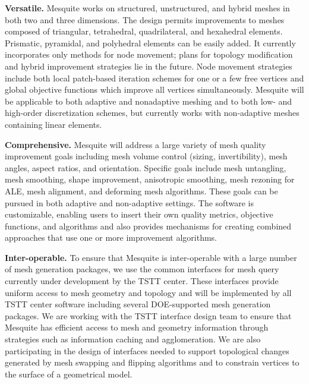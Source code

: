 {\bf Versatile.}  Mesquite works on structured, unstructured, and
hybrid meshes in both two and three dimensions. The design permits
improvements to meshes composed of triangular, tetrahedral,
quadrilateral, and hexahedral elements. Prismatic, pyramidal, and
polyhedral elements can be easily added.  It currently incorporates
only methods for node movement; plans for topology modification and
hybrid improvement strategies lie in the future.  Node movement
strategies include both local patch-based iteration schemes for one or
a few free vertices and global objective functions which improve all
vertices simultaneously. Mesquite will be applicable to both adaptive
and nonadaptive meshing and to both low- and high-order discretization
schemes, but currently works with non-adaptive meshes containing
linear elements. \newline

{\bf Comprehensive.}  Mesquite will address a large variety of mesh
quality improvement goals including mesh volume control (sizing,
invertibility), mesh angles, aspect ratios, and orientation. Specific
goals include mesh untangling, mesh smoothing, shape improvement,
anisotropic smoothing, mesh rezoning for ALE, mesh alignment, and
deforming mesh algorithms. These goals can be pursued in both adaptive
and non-adaptive settings. The software is customizable, enabling
users to insert their own quality metrics, objective functions, and
algorithms and also provides mechanisms for creating combined
approaches that use one or more improvement algorithms. \newline


{\bf Inter-operable.}  To ensure that Mesquite is inter-operable with a
large number of mesh generation packages, we use the common
interfaces for mesh query currently under development by the TSTT
center.  These interfaces provide uniform access to mesh geometry and
topology and will be implemented by all TSTT center software including
several DOE-supported mesh generation packages.  We are working with
the TSTT interface design team to ensure that Mesquite has efficient
access to mesh and geometry information through strategies such as
information caching and agglomeration.  We are also participating in
the design of interfaces needed to support topological changes
generated by mesh swapping and flipping algorithms and to constrain
vertices to the surface of a geometrical model. \newline

